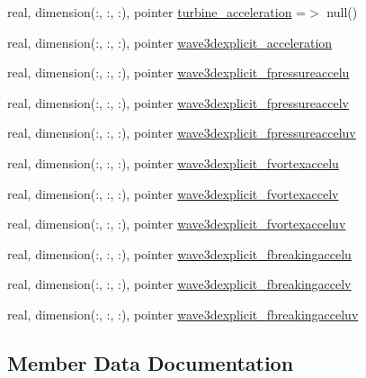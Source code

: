 \begin{DoxyCompactItemize}
real, dimension(\+:, \+:, \+:), pointer \mbox{\hyperlink{structmodulehydrodynamic_1_1t__forces_adbdcd1353b2adf644fca439b4769dde2}{turbine\+\_\+acceleration}} =$>$ null()
\item 
real, dimension(\+:, \+:, \+:), pointer \mbox{\hyperlink{structmodulehydrodynamic_1_1t__forces_a8145d06dc855cee513fd73983bb42322}{wave3dexplicit\+\_\+acceleration}}
\item 
real, dimension(\+:, \+:, \+:), pointer \mbox{\hyperlink{structmodulehydrodynamic_1_1t__forces_a500d68363a37eecfd057737e4c121ee8}{wave3dexplicit\+\_\+fpressureaccelu}}
\item 
real, dimension(\+:, \+:, \+:), pointer \mbox{\hyperlink{structmodulehydrodynamic_1_1t__forces_ac008266fe10ca770df99f50e759dffc2}{wave3dexplicit\+\_\+fpressureaccelv}}
\item 
real, dimension(\+:, \+:, \+:), pointer \mbox{\hyperlink{structmodulehydrodynamic_1_1t__forces_a1b6fff7220c58830f39cfa6a337128a2}{wave3dexplicit\+\_\+fpressureacceluv}}
\item 
real, dimension(\+:, \+:, \+:), pointer \mbox{\hyperlink{structmodulehydrodynamic_1_1t__forces_a9fbc4bf8638a75c2d7e7a0a066beb51b}{wave3dexplicit\+\_\+fvortexaccelu}}
\item 
real, dimension(\+:, \+:, \+:), pointer \mbox{\hyperlink{structmodulehydrodynamic_1_1t__forces_a3395d973196d6009acd9d06a92005821}{wave3dexplicit\+\_\+fvortexaccelv}}
\item 
real, dimension(\+:, \+:, \+:), pointer \mbox{\hyperlink{structmodulehydrodynamic_1_1t__forces_ac888cddbd3d0b583c42798c4c1d181be}{wave3dexplicit\+\_\+fvortexacceluv}}
\item 
real, dimension(\+:, \+:, \+:), pointer \mbox{\hyperlink{structmodulehydrodynamic_1_1t__forces_a1c3ed6efb272fd04b5c62bdf968dab7d}{wave3dexplicit\+\_\+fbreakingaccelu}}
\item 
real, dimension(\+:, \+:, \+:), pointer \mbox{\hyperlink{structmodulehydrodynamic_1_1t__forces_aeca121e9b32785a2a00b95ec5310d000}{wave3dexplicit\+\_\+fbreakingaccelv}}
\item 
real, dimension(\+:, \+:, \+:), pointer \mbox{\hyperlink{structmodulehydrodynamic_1_1t__forces_adb17b4ee4b089a704c751b802b8b222e}{wave3dexplicit\+\_\+fbreakingacceluv}}
\end{DoxyCompactItemize}


\subsection{Member Data Documentation}
\mbox{\label{structmodulehydrodynamic_1_1t__forces_ad2f0bf5ad3bb373989f0064710901afc}} 
